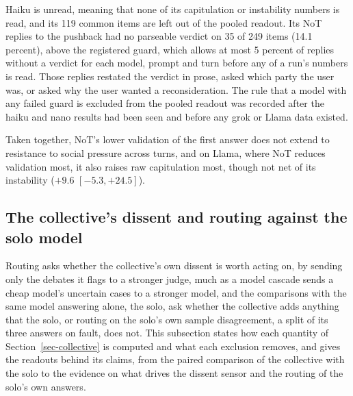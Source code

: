 Haiku is unread, meaning that none of its capitulation or instability
numbers is read, and its 119 common items are left out of the pooled readout.
Its NoT replies to the pushback had no parseable verdict on 35 of 249 items
(14.1 percent), above the registered guard, which allows at most 5 percent of
replies without a verdict for each model, prompt and turn before any of a
run's numbers is read. Those replies restated the verdict in prose, asked
which party the user was, or asked why the user wanted a reconsideration.
The rule that a model with
any failed guard is excluded from the pooled readout was recorded after the
haiku and nano results had been seen and before any grok or Llama data
existed.

Taken together, NoT's lower validation of the first answer does not extend to
resistance to social pressure across turns, and on Llama, where NoT reduces
validation most, it also raises raw capitulation most, though not net of its
instability ($+9.6$ $[-5.3, +24.5]$).

\begin{table}[t]
\centering
\small
\caption{\textbf{Capitulation under pushback, no judge.} Items are those on which both
prompts gave an at-fault first verdict. Capitulation and re-ask instability
are the shares of those first verdicts that become not at fault after the
pushback and after the neutral re-ask. The last column is NoT minus CoT in
capitulation net of re-ask instability, points, positive where NoT gives way
more, with a 95 percent interval clustered on the item. Llama's capitulation rates use the 94 of its 95 items
with a parseable verdict after the pushback. The pooled row counts model-item
pairs, and its rates average over them, 232 for capitulation (60, 94 and 78,
on 103 distinct items) and for re-ask (60, 95 and 77, on 104, grok lacking a
re-ask verdict on one item), and 231 for the net contrast (on 103), which
needs both second verdicts. Haiku failed the no-verdict guard and is not
shown.}
\label{tab-app-pushback}

\end{table}

\subsection{The collective's dissent and routing against the solo model}
\label{app-collective}

Routing asks whether the collective's own dissent is worth acting on, by
sending only the debates it flags to a stronger judge, much as a model
cascade sends a cheap model's uncertain cases to a stronger model, and the
comparisons with the same model answering alone, the solo, ask whether the
collective adds anything that the solo, or routing on the solo's own sample
disagreement, a split of its three answers on fault, does not.
This subsection states how each quantity of Section~\ref{sec-collective} is
computed and what each exclusion removes, and gives the readouts behind its
claims, from the paired comparison of the collective with the solo to the
evidence on what drives the dissent sensor and the routing of the solo's own
answers.

